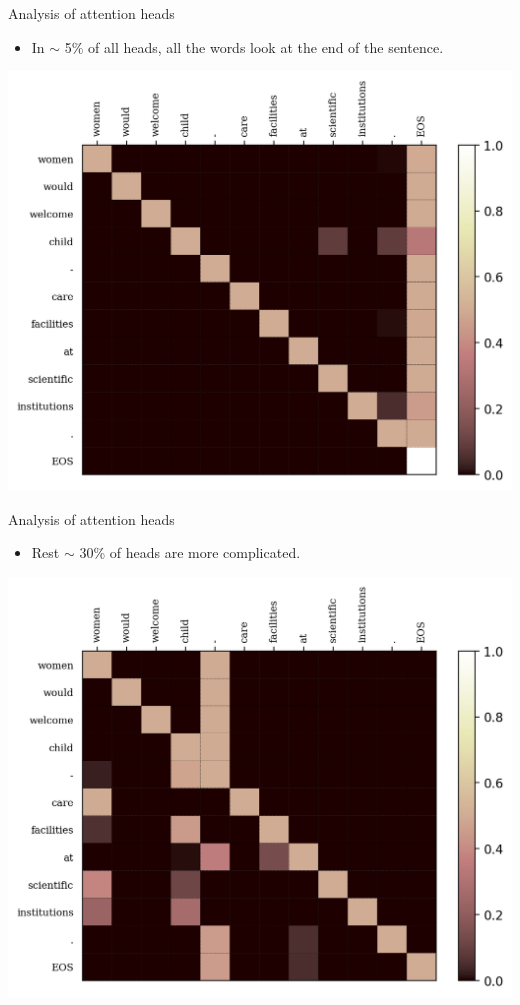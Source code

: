 \documentclass{beamer}
\begin{document}
\begin{frame}{Analysis of attention heads}
    \begin{itemize}
         \item In $\sim$ 5\% of all heads, all the words look at the end of the sentence.
    \end{itemize}
    \begin{center}
        \includegraphics[scale=0.5]{look_at_eos.png}
    \end{center}
\end{frame}

\begin{frame}{Analysis of attention heads}
    \begin{itemize}
         \item Rest $\sim$ 30\% of heads are more complicated.
    \end{itemize}
    \begin{center}
        \includegraphics[scale=0.5]{more_complicated.png}
    \end{center}
\end{frame}
\end{document}
